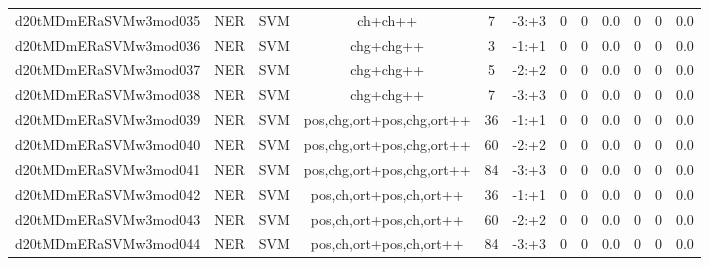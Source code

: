 \documentclass[a4paper]{article}
\begin{document}
\begin{landscape}
\begin{center}
\begin{tabular}{ |c|c|c|c|c|c|c|c|c|c|c|c|}
 
 	
 	\small{ d20tMDmERaSVMw3mod035 } & \small{ NER} & \small{  SVM }  & ch+ch++  &  7 &  \small{  -3:+3 }  &  0 & 0 & 0.0  &  0 & 0 & 0.0 \\
 	

 
 	
 	\small{ d20tMDmERaSVMw3mod036 } & \small{ NER} & \small{  SVM }  & chg+chg++  &  3 &  \small{  -1:+1 }  &  0 & 0 & 0.0  &  0 & 0 & 0.0 \\
 	

 
 	
 	\small{ d20tMDmERaSVMw3mod037 } & \small{ NER} & \small{  SVM }  & chg+chg++  &  5 &  \small{  -2:+2 }  &  0 & 0 & 0.0  &  0 & 0 & 0.0 \\
 	

 
 	
 	\small{ d20tMDmERaSVMw3mod038 } & \small{ NER} & \small{  SVM }  & chg+chg++  &  7 &  \small{  -3:+3 }  &  0 & 0 & 0.0  &  0 & 0 & 0.0 \\
 	

 
 	
 	\small{ d20tMDmERaSVMw3mod039 } & \small{ NER} & \small{  SVM }  & pos,chg,ort+pos,chg,ort++  &  36 &  \small{  -1:+1 }  &  0 & 0 & 0.0  &  0 & 0 & 0.0 \\
 	

 
 	
 	\small{ d20tMDmERaSVMw3mod040 } & \small{ NER} & \small{  SVM }  & pos,chg,ort+pos,chg,ort++  &  60 &  \small{  -2:+2 }  &  0 & 0 & 0.0  &  0 & 0 & 0.0 \\
 	

 
 	
 	\small{ d20tMDmERaSVMw3mod041 } & \small{ NER} & \small{  SVM }  & pos,chg,ort+pos,chg,ort++  &  84 &  \small{  -3:+3 }  &  0 & 0 & 0.0  &  0 & 0 & 0.0 \\
 	

 
 	
 	\small{ d20tMDmERaSVMw3mod042 } & \small{ NER} & \small{  SVM }  & pos,ch,ort+pos,ch,ort++  &  36 &  \small{  -1:+1 }  &  0 & 0 & 0.0  &  0 & 0 & 0.0 \\
 	

 
 	
 	\small{ d20tMDmERaSVMw3mod043 } & \small{ NER} & \small{  SVM }  & pos,ch,ort+pos,ch,ort++  &  60 &  \small{  -2:+2 }  &  0 & 0 & 0.0  &  0 & 0 & 0.0 \\
 	

 
 	
 	\small{ d20tMDmERaSVMw3mod044 } & \small{ NER} & \small{  SVM }  & pos,ch,ort+pos,ch,ort++  &  84 &  \small{  -3:+3 }  &  0 & 0 & 0.0  &  0 & 0 & 0.0 \\
 	


\end{tabular}
\end{center}
\end{landscape}
\end{document}
